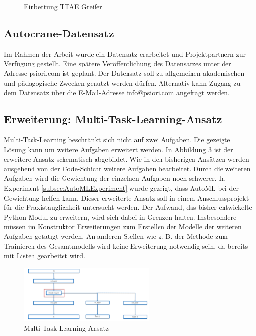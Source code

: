 \begin{figure}[h]
\begin{subfigure}[c]{0.6\textwidth}
 			\label{img:TTGrappleEinbettungVorhersage}	
 		\end{subfigure}
 		\caption{Einbettung TTAE Greifer}
 		\label{img:TTGrappleEmb}
 	\end{figure}
 	
	\subsection{Autocrane-Datensatz}
	\label{subsec:AutocraneDatensatz}	
	Im Rahmen der Arbeit wurde ein Datensatz erarbeitet und Projektpartnern zur Verfügung gestellt. Eine spätere Veröffentlichung des Datensatzes unter der Adresse psiori.com ist geplant. Der Datensatz soll zu allgemeinen akademischen und pädagogische Zwecken genutzt werden dürfen. Alternativ kann Zugang zu dem Datensatz über die E-Mail-Adresse info@psiori.com angefragt werden.

	\subsection{Erweiterung: Multi-Task-Learning-Ansatz}
	\label{subsec:MehrfacheAufgaben}
	Multi-Task-Learning beschränkt sich nicht auf zwei Aufgaben. Die gezeigte Lösung kann um weitere Aufgaben erweitert werden. In Abbildung \ref{img:AusblickMultiTaskAnsatz} ist der erweitere Ansatz schematisch abgebildet. Wie in den bisherigen Ansätzen werden ausgehend von der Code-Schicht weitere Aufgaben bearbeitet. Durch die weiteren Aufgaben wird die Gewichtung der einzelnen Aufgaben noch schwerer. In Experiment \ref{subsec:AutoMLExperiment}  wurde gezeigt, dass AutoML bei der Gewichtung helfen kann. Dieser erweiterte Ansatz soll in einem Anschlussprojekt für die Praxistauglichkeit untersucht werden. Der Aufwand, das bisher entwickelte Python-Modul zu erweitern, wird sich dabei in Grenzen halten. Insbesondere müssen im Konstruktor Erweiterungen zum Erstellen der Modelle der weiteren Aufgaben getätigt werden. An anderen Stellen wie z. B. der Methode zum Trainieren des Gesamtmodells wird keine Erweiterung notwendig sein, da bereits mit Listen gearbeitet wird.
	\begin{figure}[h]
		\centering
		\includegraphics[width=0.6\textwidth, center]{bilder/FazitUndAusblick/MultiTaskAnsatz.PNG}
		\caption{Multi-Task-Learning-Ansatz}
		\label{img:AusblickMultiTaskAnsatz}
	\end{figure}

